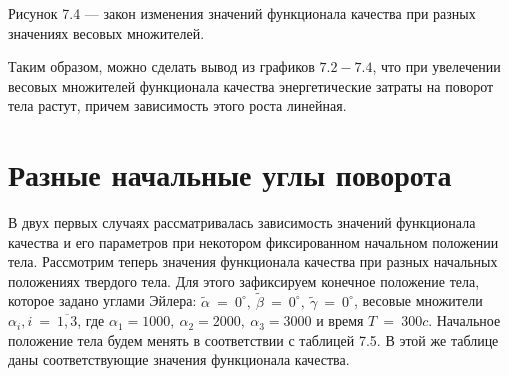 \documentclass[14pt]{extreport}
\begin{document}
\begin{itemize}
\begin{center}
Рисунок 7.4 --- закон изменения значений функционала качества при разных значениях весовых множителей. 
\end{center}

\end{itemize}

Таким образом, можно сделать вывод из графиков $7.2 - 7.4$, что при увелечении весовых множителей функционала качества
энергетические затраты на поворот тела растут, причем зависимость этого роста линейная.

\section{Разные начальные углы поворота}

В двух первых случаях рассматривалась зависимость значений функционала качества и его параметров при некотором фиксированном начальном положении тела.
Рассмотрим теперь значения функционала качества при разных начальных положениях твердого тела. Для этого зафиксируем конечное положение тела, которое 
задано углами Эйлера: $\widetilde\alpha\ =\ 0^{\circ},\ \widetilde\beta\ =\ 0^{\circ},\ \widetilde\gamma\ =\ 0^{\circ}$, весовые множители 
$\alpha_i, i\ =\ \overline{1, 3}$, где $\alpha_1 = 1000,\ \alpha_2 = 2000,\ \alpha_3 = 3000$ и время $T\ =\ 300c$. Начальное положение тела будем менять
в соответствии с таблицей 7.5. В этой же таблице даны соответствующие значения функционала качества.
\end{document}
